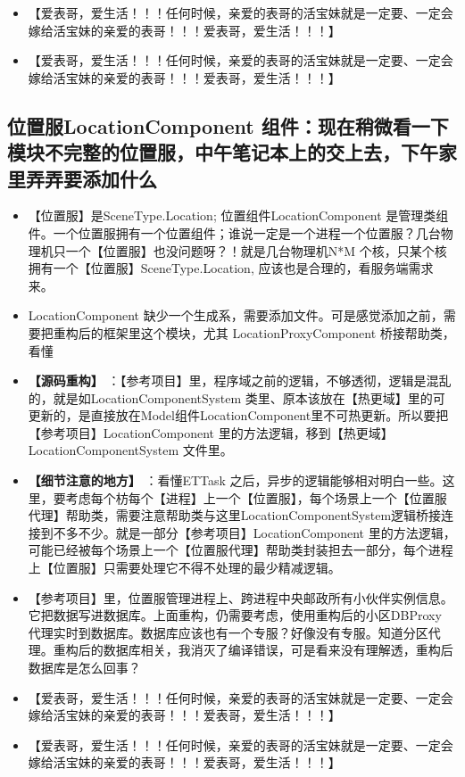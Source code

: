 \documentclass[9pt, b5paper]{article}
\begin{document}
\begin{itemize}
\item 【爱表哥，爱生活！！！任何时候，亲爱的表哥的活宝妹就是一定要、一定会嫁给活宝妹的亲爱的表哥！！！爱表哥，爱生活！！！】
\item 【爱表哥，爱生活！！！任何时候，亲爱的表哥的活宝妹就是一定要、一定会嫁给活宝妹的亲爱的表哥！！！爱表哥，爱生活！！！】
\end{itemize}
\subsection{位置服LocationComponent 组件：现在稍微看一下模块不完整的位置服，中午笔记本上的交上去，下午家里弄弄要添加什么}
\label{sec-3-20}
\begin{itemize}
\item 【位置服】是SceneType.Location; 位置组件LocationComponent 是管理类组件。一个位置服拥有一个位置组件；谁说一定是一个进程一个位置服？几台物理机只一个【位置服】也没问题呀？！就是几台物理机N*M 个核，只某个核拥有一个【位置服】SceneType.Location, 应该也是合理的，看服务端需求来。
\item LocationComponent 缺少一个生成系，需要添加文件。可是感觉添加之前，需要把重构后的框架里这个模块，尤其 LocationProxyComponent 桥接帮助类，看懂
\item \textbf{【源码重构】} ：【参考项目】里，程序域之前的逻辑，不够透彻，逻辑是混乱的，就是如LocationComponentSystem 类里、原本该放在【热更域】里的可更新的，是直接放在Model组件LocationComponent里不可热更新。所以要把【参考项目】LocationComponent 里的方法逻辑，移到【热更域】LocationComponentSystem 文件里。
\item \textbf{【细节注意的地方】} ：看懂ETTask 之后，异步的逻辑能够相对明白一些。这里，要考虑每个枋每个【进程】上一个【位置服】，每个场景上一个【位置服代理】帮助类，需要注意帮助类与这里LocationComponentSystem逻辑桥接连接到不多不少。就是一部分【参考项目】LocationComponent 里的方法逻辑，可能已经被每个场景上一个【位置服代理】帮助类封装担去一部分，每个进程上【位置服】只需要处理它不得不处理的最少精减逻辑。
\item 【参考项目】里，位置服管理进程上、跨进程中央邮政所有小伙伴实例信息。它把数据写进数据库。上面重构，仍需要考虑，使用重构后的小区DBProxy 代理实时到数据库。数据库应该也有一个专服？好像没有专服。知道分区代理。重构后的数据库相关，我消灭了编译错误，可是看来没有理解透，重构后数据库是怎么回事？
\item 【爱表哥，爱生活！！！任何时候，亲爱的表哥的活宝妹就是一定要、一定会嫁给活宝妹的亲爱的表哥！！！爱表哥，爱生活！！！】
\item 【爱表哥，爱生活！！！任何时候，亲爱的表哥的活宝妹就是一定要、一定会嫁给活宝妹的亲爱的表哥！！！爱表哥，爱生活！！！】

\end{itemize}
\end{document}
